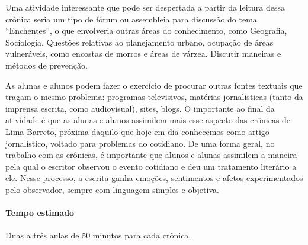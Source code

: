 \documentclass{extarticle}
\begin{document}
Uma atividade interessante que pode ser despertada a partir da leitura
dessa crônica seria um tipo de fórum ou assembleia para discussão do
tema ``Enchentes'', o que envolveria outras áreas do conhecimento, como
Geografia, Sociologia. Questões relativas ao planejamento urbano,
ocupação de áreas vulneráveis, como encostas de morros e áreas de
várzea. Discutir maneiras e métodos de prevenção.

As alunas e alunos podem fazer o exercício de procurar outras fontes
textuais que tragam o mesmo problema: programas televisivos, matérias
jornalísticas (tanto da imprensa escrita, como audiovisual), sites,
blogs. O importante ao final da atividade é que as alunas e alunos
assimilem mais esse aspecto das crônicas de Lima Barreto, próxima
daquilo que hoje em dia conhecemos como artigo jornalístico, voltado
para problemas do cotidiano. De uma forma geral, no trabalho com as
crônicas, é importante que alunos e alunas assimilem a maneira pela qual
o escritor observou o evento cotidiano e deu um tratamento literário a
ele. Nesse processo, a escrita ganha emoções, sentimentos e afetos
experimentados pelo observador, sempre com linguagem simples e objetiva.

\paragraph{Tempo estimado} Duas a três aulas de 50 minutos para cada
crônica.




\end{document}
